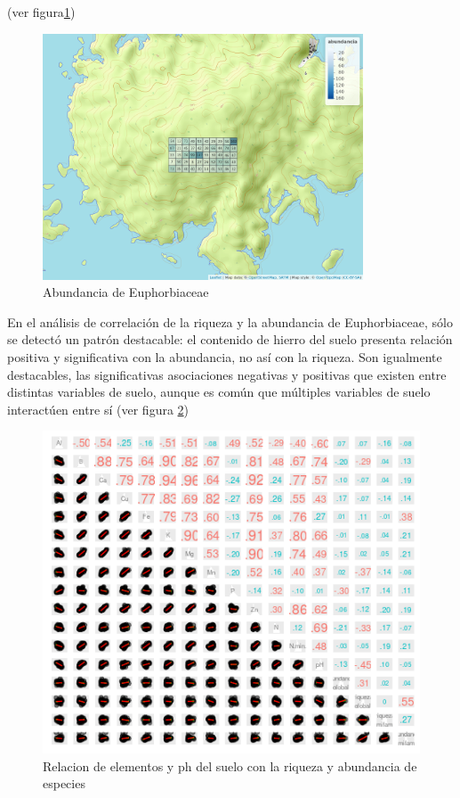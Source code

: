 \documentclass[11pt,]{article}
\begin{document}
(ver figura\ref{fig:cuadro_abundancia_de_mi_familia})

\begin{figure}
\centering
\includegraphics[width=0.85000\textwidth]{mapa_cuadros_abun_mi_familia.png}
\caption{\label{fig:cuadro_abundancia_de_mi_familia}Abundancia de
Euphorbiaceae}
\end{figure}

En el análisis de correlación de la riqueza y la abundancia de
Euphorbiaceae, sólo se detectó un patrón destacable: el contenido de
hierro del suelo presenta relación positiva y significativa con la
abundancia, no así con la riqueza. Son igualmente destacables, las
significativas asociaciones negativas y positivas que existen entre
distintas variables de suelo, aunque es común que múltiples variables de
suelo interactúen entre sí (ver figura \ref{fig:suelo_ph_abun_riqu})

\begin{figure}
\centering
\includegraphics{suelo_ph_abun_riqu.png}
\caption{\label{fig:suelo_ph_abun_riqu}Relacion de elementos y ph del
suelo con la riqueza y abundancia de especies}
\end{figure}
\end{document}
